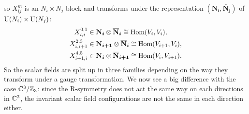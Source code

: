 \documentclass[a4paper,10pt]{article}
\begin{document}
        so $X^m_{ij}$ is an $N_i\times N_j$ block and transforms under the representation $(\boldsymbol{\textbf{N}_i},\boldsymbol{\bar{\textbf{N}}_j})$ of $\text{U}(N_i)\times\text{U}(N_j)$:
        \begin{align}
            X^{0,1}_{i,i} &\in \boldsymbol{\textbf{N}_i}\otimes\boldsymbol{\overline{\textbf{N}}_i} \cong \text{Hom}(V_i,V_i),\\
            X^{2,3}_{i,i+1} &\in \boldsymbol{\textbf{N}_{i+1}}\otimes\boldsymbol{\overline{\textbf{N}}_i} \cong \text{Hom}(V_{i+1},V_i),\\
            X^{4,5}_{i+1,i} &\in \boldsymbol{\textbf{N}_i}\otimes\boldsymbol{\overline{\textbf{N}}_{i+1}} \cong \text{Hom}(V_i,V_{i+1}).
        \end{align}
        So the scalar fields are split up in three families depending on the way they transform under a gauge transformation. We now see a big difference with the case $\mathbb{C}^3/\mathbb{Z}_3$: since the R-symmetry does not act the same way on each directions in $\mathbb{C}^3$, the invariant scalar field configurations are not the same in each direction either.
\end{document}
